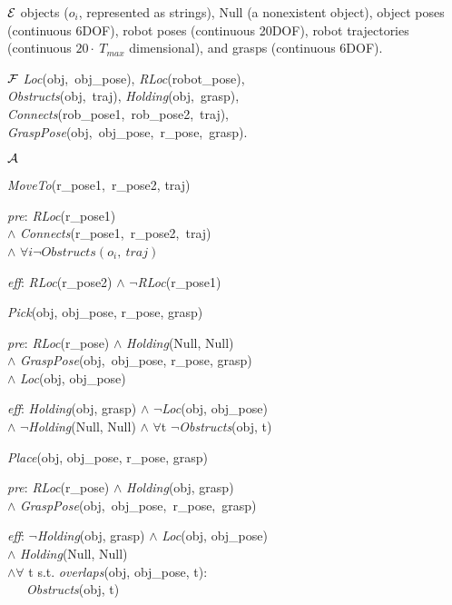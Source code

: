 \begin{tightlist}
\item[$\mathcal{E}$] objects ($o_i$, represented as strings), Null (a
  nonexistent object), object poses (continuous 6DOF), robot poses
  (continuous 20DOF), robot trajectories (continuous $20\cdot~T_{max}$ dimensional),
  and grasps (continuous 6DOF).
\item[$\mathcal{F}$] \emph{Loc}(obj,~obj\_pose), \emph{RLoc}(robot\_pose),
  \\\emph{Obstructs}(obj,~traj), \emph{Holding}(obj,~grasp),
  \\\emph{Connects}(rob\_pose1,~rob\_pose2,~traj),
  \\\emph{GraspPose}(obj,~obj\_pose,~r\_pose,~grasp).
\item[$\mathcal{A}$] \begin{tightlist} \item \emph{MoveTo}(r\_pose1,~r\_pose2, traj)
\begin{tightlist}
   \item[\emph{pre}:] \emph{RLoc}(r\_pose1) \\$\wedge$ \emph{Connects}(r\_pose1,~r\_pose2,~traj) \\$\wedge$ $\forall i \lnot Obstructs(o_i,~traj)$
   \item[\emph{eff}:] \emph{RLoc}(r\_pose2) $\wedge$ $\lnot$\emph{RLoc}(r\_pose1)
\end{tightlist}
\item \emph{Pick}(obj, obj\_pose, r\_pose, grasp)
\begin{tightlist}
   \item[\emph{pre}:] \emph{RLoc}(r\_pose) $\wedge$ \emph{Holding}(Null, Null) \\$\wedge$ \emph{GraspPose}(obj,~obj\_pose, r\_pose, grasp) \\$\wedge$ \emph{Loc}(obj, obj\_pose)
   \item[\emph{eff}:] \emph{Holding}(obj, grasp) $\wedge$ $\lnot$\emph{Loc}(obj, obj\_pose) \\$\wedge$ $\lnot$\emph{Holding}(Null, Null) $\wedge$ $\forall$t $\lnot$\emph{Obstructs}(obj, t)
\end{tightlist}
\item \emph{Place}(obj, obj\_pose, r\_pose, grasp)
\begin{tightlist}
   \item[\emph{pre}:] \emph{RLoc}(r\_pose) $\wedge$ \emph{Holding}(obj, grasp) \\ $\wedge$ \emph{GraspPose}(obj,~obj\_pose,~r\_pose,~grasp)
   \item[\emph{eff}:] $\lnot$\emph{Holding}(obj, grasp) $\wedge$ \emph{Loc}(obj, obj\_pose) \\$\wedge$ \emph{Holding}(Null, Null)\\ $\wedge \forall$ t s.t. \emph{overlaps}(obj, obj\_pose, t): \\ \indent \indent \ \ \ \emph{Obstructs}(obj, t)
\end{tightlist}
\end{tightlist}
\end{tightlist}
